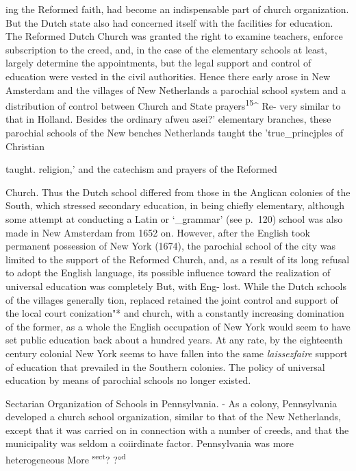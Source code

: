 \documentclass[
]{book}
\begin{document}
ing the Reformed faith, had become an indispensable part of church organization. But the Dutch state also had concerned itself with the facilities for education. The Reformed Dutch Church was granted the right to examine teachers, enforce subscription to the creed, and, in the case of the elementary schools at least, largely determine the appointments, but the legal support and control of education were vested in the civil authorities. Hence there early arose in New Amsterdam and the villages of New Netherlands a parochial school system and a distribution of control between Church and State prayers\textsuperscript{15}\^{} Re- very similar to that in Holland. Besides the ordinary afweu asei?' elementary branches, these parochial schools of the New benches Netherlands taught the 'true\_princjples of Christian

taught. religion,' and the catechism and prayers of the Reformed

Church. Thus the Dutch school differed from those in the Anglican colonies of the South, which stressed secondary education, in being chiefly elementary, although some attempt at conducting a Latin or `\_grammar' (see p.~120) school was also made in New Amsterdam from 1652 on. However, after the English took permanent possession of New York (1674), the parochial school of the city was limited to the support of the Reformed Church, and, as a result of its long refusal to adopt the English language, its possible influence toward the realization of universal education was completely But, with Eng- lost. While the Dutch schools of the villages generally tion, replaced retained the joint control and support of the local court conization"* and church, with a constantly increasing domination of the former, as a whole the English occupation of New York would seem to have set public education back about a hundred years. At any rate, by the eighteenth\protect\hypertarget{ch17.xmlux5cux23para.250.1.0.box.101.249.1045.206.q.70}{}{ century colonial New York seems to have fallen into the same \emph{laissezfaire} support of education that prevailed in the Southern colonies. The policy of universal education by means of parochial schools no longer existed.}

Sectarian Organization of Schools in Pennsylvania. - As a colony, Pennsylvania developed a church school organization, similar to that of the New Netherlands, except that it was carried on in connection with a number of creeds, and that the municipality was seldom a coiirdinate factor. Pennsylvania was more heterogeneous More \textsuperscript{sect}? ?°\textsuperscript{d}
\end{document}
